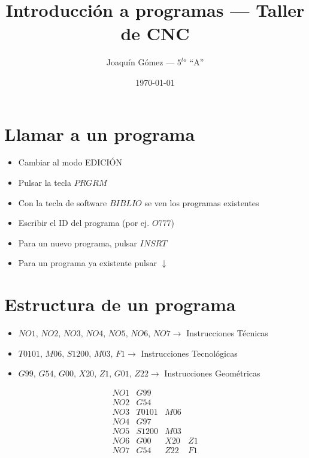 \documentclass{article}
\title{Introducción a programas --- Taller de CNC}
\author{Joaquín Gómez --- $5^{to}$ ``A''}
\date{\today}
\begin{document}
\maketitle
\section{Llamar a un programa}
\begin{itemize}
    \item Cambiar al modo EDICIÓN
    \item Pulsar la tecla $PRGRM$
    \item Con la tecla de software $BIBLIO$ se ven los programas existentes
    \item Escribir el ID del programa (por ej. $O777$)
    \item Para un nuevo programa, pulsar $INSRT$
    \item Para un programa ya existente pulsar { $\downarrow$ }
\end{itemize}

\section{Estructura de un programa}

\begin{itemize}
    \item $NO1,\,NO2,\,NO3,\,NO4,\,NO5,\,NO6,\,NO7 \longrightarrow$ Instrucciones Técnicas
    \item $T0101,\,M06,\,S1200,\,M03,\,F1 \longrightarrow$ Instrucciones Tecnológicas
    \item $G99,\,G54,\,G00,\,X20,\,Z1,\,G01,\,Z22 \longrightarrow$ Instrucciones Geométricas
\end{itemize}

\begin{equation*}
    \begin{matrix}
        NO1 & G99   &     &    \\
        NO2 & G54   &     &    \\
        NO3 & T0101 & M06      \\
        NO4 & G97   &     &    \\
        NO5 & S1200 & M03 &    \\
        NO6 & G00   & X20 & Z1 \\
        NO7 & G54   & Z22 & F1 \\
    \end{matrix}
\end{equation*}
\end{document}
